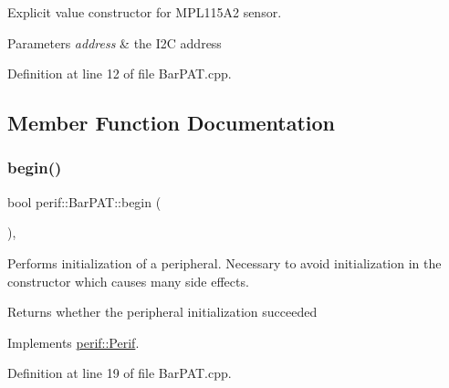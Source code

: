 Explicit value constructor for M\+P\+L115\+A2 sensor.


\begin{DoxyParams}{Parameters}
{\em address} & the I2C address \\
\hline
\end{DoxyParams}


Definition at line 12 of file Bar\+P\+A\+T.\+cpp.


\begin{DoxyCode}{0}

\end{DoxyCode}


\subsection{Member Function Documentation}
\mbox{\label{classperif_1_1BarPAT_a591d84e84cfd9ec251d1ff8322e23ebb}} 
\subsubsection{\texorpdfstring{begin()}{begin()}}
{\footnotesize\ttfamily bool perif\+::\+Bar\+P\+A\+T\+::begin (\begin{DoxyParamCaption}{ }\end{DoxyParamCaption})\hspace{0.3cm}{\ttfamily [override]}, {\ttfamily [virtual]}}

Performs initialization of a peripheral. Necessary to avoid initialization in the constructor which causes many side effects.

\begin{DoxyReturn}{Returns}
whether the peripheral initialization succeeded 
\end{DoxyReturn}


Implements \mbox{\hyperlink{classperif_1_1Perif_ae7f1d1a4e9cd2343d51abc4ee21000cf}{perif\+::\+Perif}}.



Definition at line 19 of file Bar\+P\+A\+T.\+cpp.


